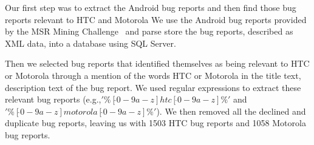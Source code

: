 \documentclass[10pt, conference, compsocconf]{IEEEtran}
\begin{document}

Our first step was to extract the Android bug reports and then find
those bug reports relevant to HTC and Motorola
We use the Android bug reports provided by the MSR Mining
Challenge~\cite{MSRChallenge2012}
and parse store the bug reports, described as XML data, into a
database using SQL
Server. 

Then we selected bug reports that identified themselves as being
relevant to HTC or Motorola through a mention of the words HTC or
Motorola in the title text, description text of the bug report.  
We used regular expressions to extract these relevant bug reports (e.g.,$'\%[\hat{ }0-9a-z]htc[ \hat{ }0-9a-z]\%'$ and $'\%[ \hat{ }0-9a-z]motorola[ \hat{ }0-9a-z]\%'$).
We then removed all the declined and duplicate bug reports, leaving us
with 1503 HTC bug reports and 1058 Motorola bug reports.
\end{document}
